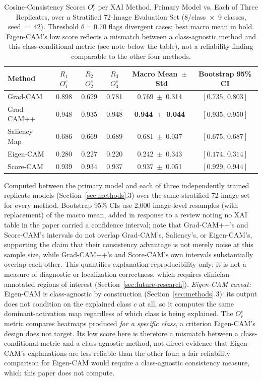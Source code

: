\begin{table}[!ht]
\centering
\caption{Cosine-Consistency Scores $O_r^c$ per XAI Method, Primary Model vs. Each of Three Replicates, over a Stratified 72-Image Evaluation Set (8/class~$\times$~9 classes, seed~=~42). Threshold $\theta=0.70$ flags divergent cases; best macro mean in bold. Eigen-CAM's low score reflects a mismatch between a class-agnostic method and this class-conditional metric (see note below the table), not a reliability finding comparable to the other four methods.}
\label{tbl:5}
\begin{tabular}{lccccc}
\toprule
Method & $R_1$ $O_1^c$ & $R_2$ $O_2^c$ & $R_3$ $O_3^c$ & Macro Mean~$\pm$~Std & Bootstrap 95\% CI \\
\midrule
Grad-CAM & 0.898 & 0.629 & 0.781 & 0.769~$\pm$~0.314 & $[0.735,\,0.803]$ \\
Grad-CAM++ & 0.948 & 0.935 & 0.948 & \textbf{0.944~$\pm$~0.044} & $[0.935,\,0.950]$ \\
Saliency Map & 0.686 & 0.669 & 0.689 & 0.681~$\pm$~0.037 & $[0.675,\,0.687]$ \\
Eigen-CAM & 0.280 & 0.227 & 0.220 & 0.242~$\pm$~0.343 & $[0.174,\,0.314]$ \\
Score-CAM & 0.939 & 0.934 & 0.937 & 0.937~$\pm$~0.051 & $[0.929,\,0.944]$ \\
\bottomrule
\end{tabular}

\vspace{2pt}
\raggedright\footnotesize Computed between the primary model and each of three independently trained replicate models (Section~\ref{sec:methods}.3) over the same stratified 72-image set for every method. Bootstrap 95\% CIs use 2,000 image-level resamples (with replacement) of the macro mean, added in response to a review noting no XAI table in the paper carried a confidence interval; note that Grad-CAM++'s and Score-CAM's intervals do not overlap Grad-CAM's, Saliency's, or Eigen-CAM's, supporting the claim that their consistency advantage is not merely noise at this sample size, while Grad-CAM++'s and Score-CAM's own intervals substantially overlap each other. This quantifies explanation reproducibility only; it is not a measure of diagnostic or localization correctness, which requires clinician-annotated regions of interest (Section~\ref{sec:future-research}). \textit{Eigen-CAM caveat:} Eigen-CAM is class-agnostic by construction (Section~\ref{sec:methods}.3): its output does not condition on the explained class $c$ at all, so it computes the same dominant-activation map regardless of which class is being explained. The $O_r^c$ metric compares heatmaps produced \textit{for a specific class}, a criterion Eigen-CAM's design does not target. Its low score here is therefore a mismatch between a class-conditional metric and a class-agnostic method, not direct evidence that Eigen-CAM's explanations are less reliable than the other four; a fair reliability comparison for Eigen-CAM would require a class-agnostic consistency measure, which this paper does not compute.
\end{table}

